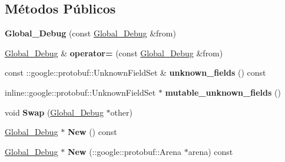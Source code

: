 \subsection*{Métodos Públicos}
\begin{DoxyCompactItemize}
\item 
{\bfseries Global\+\_\+\+Debug} (const \hyperlink{classvss__debug_1_1Global__Debug}{Global\+\_\+\+Debug} \&from)\hypertarget{classvss__debug_1_1Global__Debug_a3c59c9a4d51b615ed334ec247115bdc7}{}\label{classvss__debug_1_1Global__Debug_a3c59c9a4d51b615ed334ec247115bdc7}

\item 
\hyperlink{classvss__debug_1_1Global__Debug}{Global\+\_\+\+Debug} \& {\bfseries operator=} (const \hyperlink{classvss__debug_1_1Global__Debug}{Global\+\_\+\+Debug} \&from)\hypertarget{classvss__debug_1_1Global__Debug_a12877416f81456cec9814821b64da40c}{}\label{classvss__debug_1_1Global__Debug_a12877416f81456cec9814821b64da40c}

\item 
const \+::google\+::protobuf\+::\+Unknown\+Field\+Set \& {\bfseries unknown\+\_\+fields} () const \hypertarget{classvss__debug_1_1Global__Debug_a168d0c1a65d08db337ecedce80265660}{}\label{classvss__debug_1_1Global__Debug_a168d0c1a65d08db337ecedce80265660}

\item 
inline\+::google\+::protobuf\+::\+Unknown\+Field\+Set $\ast$ {\bfseries mutable\+\_\+unknown\+\_\+fields} ()\hypertarget{classvss__debug_1_1Global__Debug_a6fd5cc3c20a7cfa3f956285d73657ac3}{}\label{classvss__debug_1_1Global__Debug_a6fd5cc3c20a7cfa3f956285d73657ac3}

\item 
void {\bfseries Swap} (\hyperlink{classvss__debug_1_1Global__Debug}{Global\+\_\+\+Debug} $\ast$other)\hypertarget{classvss__debug_1_1Global__Debug_a86a35c7744c5f052407ea724cba349ca}{}\label{classvss__debug_1_1Global__Debug_a86a35c7744c5f052407ea724cba349ca}

\item 
\hyperlink{classvss__debug_1_1Global__Debug}{Global\+\_\+\+Debug} $\ast$ {\bfseries New} () const \hypertarget{classvss__debug_1_1Global__Debug_a4cec6538e5e848660550c88bd5df8f56}{}\label{classvss__debug_1_1Global__Debug_a4cec6538e5e848660550c88bd5df8f56}

\item 
\hyperlink{classvss__debug_1_1Global__Debug}{Global\+\_\+\+Debug} $\ast$ {\bfseries New} (\+::google\+::protobuf\+::\+Arena $\ast$arena) const \hypertarget{classvss__debug_1_1Global__Debug_a82c5f551838b587f155b3249007fced0}{}\label{classvss__debug_1_1Global__Debug_a82c5f551838b587f155b3249007fced0}


\end{DoxyCompactItemize}
